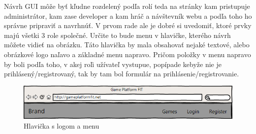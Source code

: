 Návrh GUI môže byť kľudne rozdelený podľa rolí teda na stránky kam pristupuje administrátor, kam zase developer a kam hráč a návštevník webu a podľa toho ho správne pripraviť a navrhnúť. V prvom rade ale je dobré si uvedomiť, ktoré prvky majú všetki 3 role společné. Určite to bude menu v hlavičke, kterého návrh môžete vidieť na obrázku. Táto hlavička by mala obsahovať nejaké textové, alebo obrázkové logo naľavo a základné menu napravo. Pričom položky v menu napravo by boli podľa toho, v akej roľi užívateľ vystupue, popípade kebyže nie je prihlásený/registrovaný, tak by tam bol formulár na prihlásenie/registrovanie. 
\begin{figure}[h]
  \centering
  \includegraphics[scale=0.6]{fig/gui-hlavicka.png}
  \caption{Hlavička s logom a menu}
  \label{fig:guihlavicka}
\end{figure}

